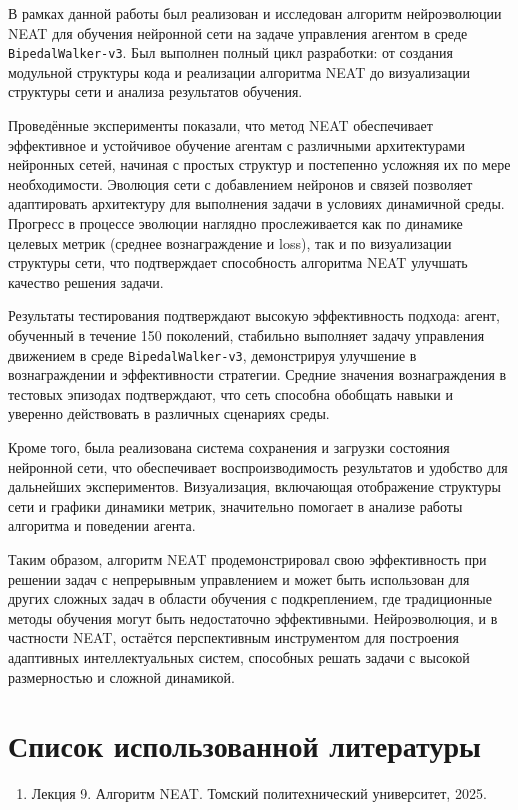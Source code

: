 \documentclass[a4paper,12pt]{article}
\begin{document}
В рамках данной работы был реализован и исследован алгоритм нейроэволюции NEAT для обучения нейронной сети на задаче управления агентом в среде \texttt{BipedalWalker-v3}. Был выполнен полный цикл разработки: от создания модульной структуры кода и реализации алгоритма NEAT до визуализации структуры сети и анализа результатов обучения.

Проведённые эксперименты показали, что метод NEAT обеспечивает эффективное и устойчивое обучение агентам с различными архитектурами нейронных сетей, начиная с простых структур и постепенно усложняя их по мере необходимости. Эволюция сети с добавлением нейронов и связей позволяет адаптировать архитектуру для выполнения задачи в условиях динамичной среды. Прогресс в процессе эволюции наглядно прослеживается как по динамике целевых метрик (среднее вознаграждение и loss), так и по визуализации структуры сети, что подтверждает способность алгоритма NEAT улучшать качество решения задачи.

Результаты тестирования подтверждают высокую эффективность подхода: агент, обученный в течение 150 поколений, стабильно выполняет задачу управления движением в среде \texttt{BipedalWalker-v3}, демонстрируя улучшение в вознаграждении и эффективности стратегии. Средние значения вознаграждения в тестовых эпизодах подтверждают, что сеть способна обобщать навыки и уверенно действовать в различных сценариях среды.

Кроме того, была реализована система сохранения и загрузки состояния нейронной сети, что обеспечивает воспроизводимость результатов и удобство для дальнейших экспериментов. Визуализация, включающая отображение структуры сети и графики динамики метрик, значительно помогает в анализе работы алгоритма и поведении агента.

Таким образом, алгоритм NEAT продемонстрировал свою эффективность при решении задач с непрерывным управлением и может быть использован для других сложных задач в области обучения с подкреплением, где традиционные методы обучения могут быть недостаточно эффективными. Нейроэволюция, и в частности NEAT, остаётся перспективным инструментом для построения адаптивных интеллектуальных систем, способных решать задачи с высокой размерностью и сложной динамикой.
\newpage
\section*{Список использованной литературы}
\begin{enumerate}
    \item Лекция 9. Алгоритм NEAT. Томский политехнический университет, 2025.
\end{enumerate}
\end{document}
